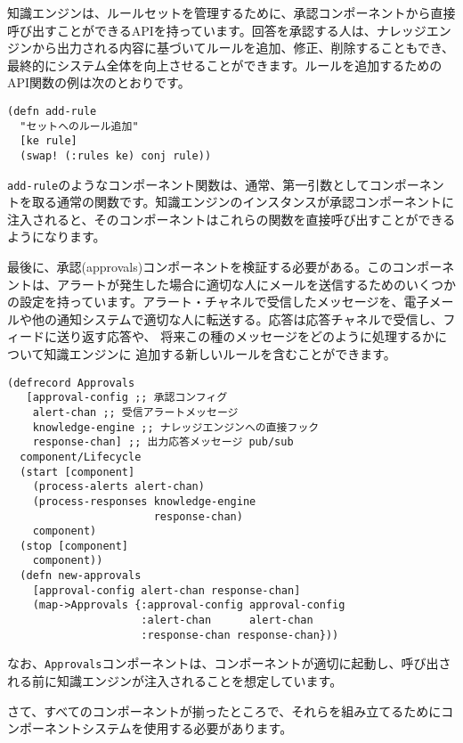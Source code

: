 知識エンジンは、ルールセットを管理するために、承認コンポーネントから直接呼び出すことができるAPIを持っています。回答を承認する人は、ナレッジエンジンから出力される内容に基づいてルールを追加、修正、削除することもでき、最終的にシステム全体を向上させることができます。ルールを追加するためのAPI関数の例は次のとおりです。

\begin{lstlisting}[numbers=none]
(defn add-rule
  "セットへのルール追加"
  [ke rule]
  (swap! (:rules ke) conj rule))
\end{lstlisting}

\texttt{add-rule}のようなコンポーネント関数は、通常、第一引数としてコンポーネントを取る通常の関数です。知識エンジンのインスタンスが承認コンポーネントに注入されると、そのコンポーネントはこれらの関数を直接呼び出すことができるようになります。

最後に、承認(approvals)コンポーネントを検証する必要がある。このコンポーネントは、アラートが発生した場合に適切な人にメールを送信するためのいくつかの設定を持っています。アラート・チャネルで受信したメッセージを、電子メールや他の通知システムで適切な人に転送する。応答は応答チャネルで受信し、フィードに送り返す応答や、 将来この種のメッセージをどのように処理するかについて知識エンジンに 追加する新しいルールを含むことができます。

\begin{lstlisting}[numbers=none]
(defrecord Approvals
   [approval-config ;; 承認コンフィグ
    alert-chan ;; 受信アラートメッセージ
    knowledge-engine ;; ナレッジエンジンへの直接フック
    response-chan] ;; 出力応答メッセージ pub/sub
  component/Lifecycle
  (start [component]
    (process-alerts alert-chan)
    (process-responses knowledge-engine
                       response-chan)
    component)
  (stop [component]
    component))
  (defn new-approvals
    [approval-config alert-chan response-chan]
    (map->Approvals {:approval-config approval-config
                     :alert-chan      alert-chan
                     :response-chan response-chan}))
\end{lstlisting}

なお、\texttt{Approvals}コンポーネントは、コンポーネントが適切に起動し、呼び出される前に知識エンジンが注入されることを想定しています。

さて、すべてのコンポーネントが揃ったところで、それらを組み立てるためにコンポーネントシステムを使用する必要があります。

